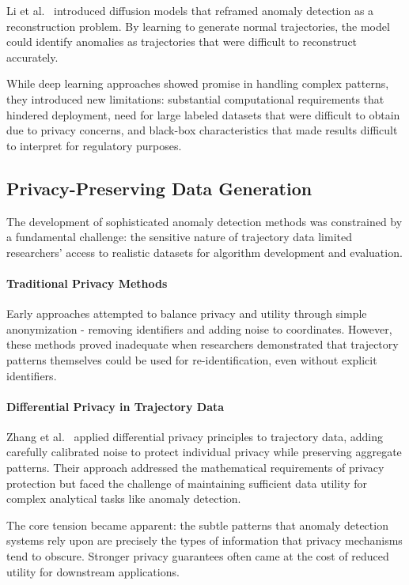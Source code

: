 \documentclass[runningheads]{llncs}
\begin{document}
Li et al.~\cite{li2023diffusion} introduced diffusion models that reframed anomaly detection as a reconstruction problem. By learning to generate normal trajectories, the model could identify anomalies as trajectories that were difficult to reconstruct accurately.

While deep learning approaches showed promise in handling complex patterns, they introduced new limitations: substantial computational requirements that hindered deployment, need for large labeled datasets that were difficult to obtain due to privacy concerns, and black-box characteristics that made results difficult to interpret for regulatory purposes.

\subsection{Privacy-Preserving Data Generation}
\label{sec:privacy-review}

The development of sophisticated anomaly detection methods was constrained by a fundamental challenge: the sensitive nature of trajectory data limited researchers' access to realistic datasets for algorithm development and evaluation.

\paragraph{Traditional Privacy Methods}
Early approaches attempted to balance privacy and utility through simple anonymization - removing identifiers and adding noise to coordinates. However, these methods proved inadequate when researchers demonstrated that trajectory patterns themselves could be used for re-identification, even without explicit identifiers.

\paragraph{Differential Privacy in Trajectory Data}
Zhang et al.~\cite{zhang2023differential} applied differential privacy principles to trajectory data, adding carefully calibrated noise to protect individual privacy while preserving aggregate patterns. Their approach addressed the mathematical requirements of privacy protection but faced the challenge of maintaining sufficient data utility for complex analytical tasks like anomaly detection.

The core tension became apparent: the subtle patterns that anomaly detection systems rely upon are precisely the types of information that privacy mechanisms tend to obscure. Stronger privacy guarantees often came at the cost of reduced utility for downstream applications.
\end{document}

